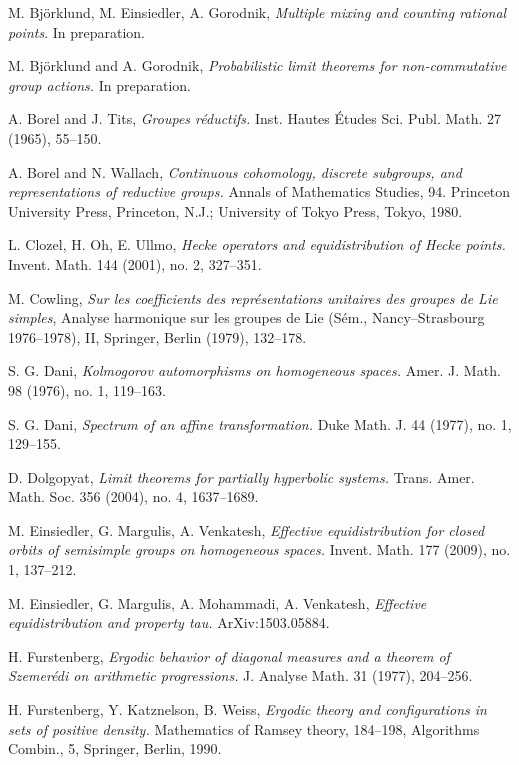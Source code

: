 \documentclass[11pt,reqno,a4paper]{amsart}
\numberwithin{equation}{section}
\theoremstyle{theorem}
\theoremstyle{definition}
\begin{document}
\begin{thebibliography}{99}

 M. Bj\"orklund, M. Einsiedler, A. Gorodnik,
\emph{Multiple mixing and counting rational points}. In preparation.

 M. Bj\"orklund and A. Gorodnik,
\emph{Probabilistic limit theorems for non-commutative group actions.}
In preparation.

 A. Borel and J. Tits, \emph{Groupes r\'eductifs.} Inst. Hautes \'Etudes Sci. Publ. Math. 27 (1965), 55--150.
	
 A. Borel and  N. Wallach, \emph{Continuous cohomology, discrete subgroups, and representations of reductive groups.} Annals of Mathematics Studies, 94. Princeton University Press, Princeton, N.J.; University of Tokyo Press, Tokyo, 1980.	
	
 L. Clozel, H. Oh, E. Ullmo,
\emph{Hecke operators and equidistribution of Hecke points. }
Invent. Math. 144 (2001), no. 2, 327--351.	
	
 M. Cowling, \emph{Sur les coefficients des repr\'esentations unitaires des groupes de Lie simples}, Analyse
harmonique sur les groupes de Lie (S\'em., Nancy--Strasbourg 1976--1978), II, Springer, Berlin (1979), 132--178.

 S. G. Dani, \emph{Kolmogorov automorphisms on homogeneous spaces.} Amer. J. Math. 98 (1976), no. 1, 119--163.

	 S. G. Dani, \emph{Spectrum of an affine transformation.} Duke Math. J. 44 (1977), no. 1, 129--155.

  D. Dolgopyat, \emph{Limit theorems for partially hyperbolic systems.} Trans. Amer. Math. Soc. 356 (2004), no. 4, 1637--1689.
	
M. Einsiedler, G. Margulis, A. Venkatesh, 
\emph{Effective equidistribution for closed orbits of semisimple groups on homogeneous spaces.} 
Invent. Math. 177 (2009), no. 1, 137--212.

 M. Einsiedler, G. Margulis, A. Mohammadi, A. Venkatesh,
\emph{Effective equidistribution and property tau.} ArXiv:1503.05884.

 H. Furstenberg,
\emph{Ergodic behavior of diagonal measures and a theorem of Szemer\'edi on arithmetic progressions. } J. Analyse Math. 31 (1977), 204--256.

 H. Furstenberg, Y. Katznelson, B. Weiss,
\emph{Ergodic theory and configurations in sets of positive density.} Mathematics of Ramsey theory, 184--198, 
Algorithms Combin., 5, Springer, Berlin, 1990. 


\end{thebibliography}
\end{document}
